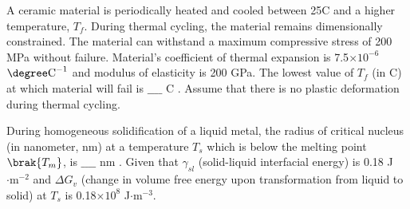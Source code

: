 \begin{figure}[!ht]
\centering
\resizebox{0.2\textwidth}{!}{%

}%
\end{figure}
\item A ceramic material is periodically heated and cooled between 25\degree C and a higher temperature, $T_f$. During thermal cycling, the material remains dimensionally constrained. The material can withstand a maximum compressive stress of 200 MPa without failure. Material's coefficient of thermal expansion is 7.5$\times 10^{-6}$ $\degree \text{C}^{-1}$ and modulus of elasticity  is 200 GPa. The lowest value of $T_f$ (in \degree C) at which material will fail is $\_\_\_\_$ \degree C . Assume that there is no plastic deformation during thermal cycling. \\
\item During homogeneous solidification of a liquid metal, the radius of critical nucleus (in nanometer, nm) at a temperature $T_s$ which is below the melting point $\brak{T_m}$, is $\_\_\_\_$ nm . Given that $\gamma_{sl}$ (solid-liquid interfacial energy) is 0.18 J$\cdot\text{m}^{-2}$ and $\Delta G_v$ (change in volume free energy upon transformation from liquid to solid) at $T_s$ is 0.18$\times 10^{8}$ J$\cdot\text{m}^{-3}$. \\
